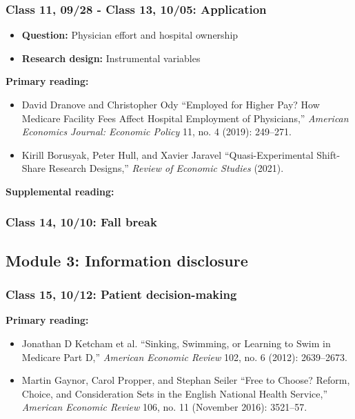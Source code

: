 \documentclass[11pt,]{article}
\providecommand{\tightlist}{%
  \setlength{\itemsep}{0pt}\setlength{\parskip}{0pt}}
\begin{document}
\hypertarget{class-11-0928---class-13-1005-application}{%
\subsubsection{Class 11, 09/28 - Class 13, 10/05:
Application}\label{class-11-0928---class-13-1005-application}}

\begin{itemize}
\tightlist
\item
  \textbf{Question:} Physician effort and hospital ownership
\item
  \textbf{Research design:} Instrumental variables
\end{itemize}

\textbf{Primary reading:}

\begin{itemize}
\tightlist
\item
  David Dranove and Christopher Ody {``Employed for Higher Pay? {How}
  {Medicare} Facility Fees Affect Hospital Employment of Physicians,''}
  \emph{American Economics Journal: Economic Policy} 11, no. 4 (2019):
  249--271.
\item
  Kirill Borusyak, Peter Hull, and Xavier Jaravel
  {``Quasi-{Experimental} {Shift}-{Share} {Research} {Designs},''}
  \emph{Review of Economic Studies} (2021).
\end{itemize}

\textbf{Supplemental reading:}

\hypertarget{class-14-1010-fall-break}{%
\subsubsection{Class 14, 10/10: Fall
break}\label{class-14-1010-fall-break}}

\hypertarget{module-3-information-disclosure}{%
\subsection{Module 3: Information
disclosure}\label{module-3-information-disclosure}}

\hypertarget{class-15-1012-patient-decision-making}{%
\subsubsection{Class 15, 10/12: Patient
decision-making}\label{class-15-1012-patient-decision-making}}

\textbf{Primary reading:}

\begin{itemize}
\tightlist
\item
  Jonathan D Ketcham et al. {``Sinking, Swimming, or Learning to Swim in
  {Medicare} {Part} {D},''} \emph{American Economic Review} 102, no. 6
  (2012): 2639--2673.
\item
  Martin Gaynor, Carol Propper, and Stephan Seiler {``Free to {Choose}?
  {Reform}, {Choice}, and {Consideration} {Sets} in the {English}
  {National} {Health} {Service},''} \emph{American Economic Review} 106,
  no. 11 (November 2016): 3521--57.
\end{itemize}
\end{document}
